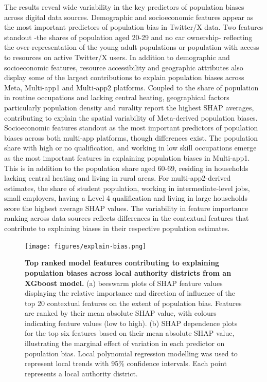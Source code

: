 \documentclass[]{rsos}%
\begin{document}
The results reveal wide variability in the key predictors of population
biases across digital data sources. Demographic and socioeconomic
features appear as the most important predictors of population bias in
Twitter/X data. Two features standout -the shares of population aged
20-29 and no car ownership- reflecting the over-representation of the
young adult populations or population with access to resources on active
Twitter/X users. In addition to demographic and socioeconomic features,
resource accessibility and geographic attributes also display some of
the largest contributions to explain population biases across Meta,
Multi-app1 and Multi-app2 platforms. Coupled to the share of population
in routine occupations and lacking central heating, geographical factors
particularly population density and rurality report the highest SHAP
averages, contributing to explain the spatial variability of
Meta-derived population biases. Socioeconomic features standout as the
most important predictors of population biases across both multi-app
platforms, though differences exist. The population share with high or
no qualification, and working in low skill occupations emerge as the
most important features in explaining population biases in Multi-app1.
This is in addition to the population share aged 60-69, residing in
households lacking central heating and living in rural areas. For
multi-app2-derived estimates, the share of student population, working
in intermediate-level jobs, small employers, having a Level 4
qualification and living in large households score the highest average
SHAP values. The variability in feature importance ranking across data
sources reflects differences in the contextual features that contribute
to explaining biases in their respective population estimates.

\begin{figure}
\centering
\texttt{[image: figures/explain-bias.png]}
\caption{\textbf{Top ranked model features contributing to explaining population
biases across local authority districts from an XGboost model.} (a)
beeswarm plots of SHAP feature values displaying the relative importance
and direction of influence of the top 20 contextual features on the
extent of population bias. Features are ranked by their mean absolute
SHAP value, with colours indicating feature values (low to high). (b)
SHAP dependence plots for the top six features based on their mean
absolute SHAP value, illustrating the marginal effect of variation in
each predictor on population bias. Local polynomial regression modelling
was used to represent local trends with 95\% confidence intervals. Each
point represents a local authority
district.}\label{fig:shap-plots}
\end{figure}
\end{document}
